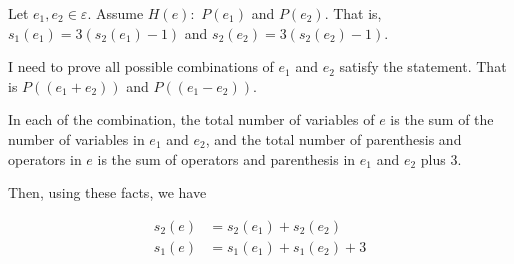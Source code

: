 \documentclass[12pt]{article}
\begin{document}
\begin{itemize}
\begin{mdframed}
\begin{enumerate}[1.]
\begin{mdframed}
                Let $e_1, e_2 \in \varepsilon$. Assume $H(e):$ $P(e_1)$ and $P(e_2)$.
                That is, $s_1(e_1) = 3(s_2(e_1) - 1)$ and $s_2(e_2) = 3(s_2(e_2) - 1)$.

                \bigskip

                I need to prove all possible combinations of $e_1$ and $e_2$ satisfy
                the statement. That is $P((e_1 + e_2))$ and $P((e_1 - e_2))$.

                \bigskip

                In each of the combination, the total number of variables of $e$
                is the sum of the number of variables in $e_1$ and $e_2$, and the
                total number of parenthesis and operators in $e$ is the sum of
                operators and parenthesis in $e_1$ and $e_2$ plus 3.

                \bigskip

                Then, using these facts, we have

                \bigskip

                \begin{align}
                    s_2(e) &= s_2(e_1) + s_2(e_2)\\
                    s_1(e) &= s_1(e_1) + s_1(e_2) + 3
                \end{align}

            \end{mdframed}
        \end{enumerate}

    \end{mdframed}
\end{itemize}
\end{document}
